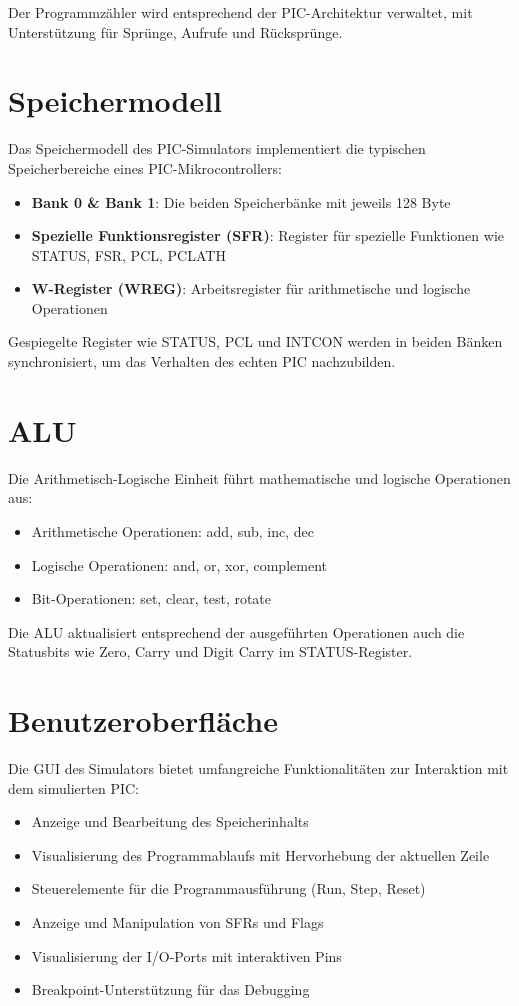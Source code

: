 \documentclass[a4paper,11pt]{report}
\begin{document}
Der Programmzähler wird entsprechend der PIC-Architektur verwaltet, mit Unterstützung für Sprünge, Aufrufe und Rücksprünge.

\section{Speichermodell}
Das Speichermodell des PIC-Simulators implementiert die typischen Speicherbereiche eines PIC-Mikrocontrollers:

\begin{itemize}
    \item \textbf{Bank 0 \& Bank 1}: Die beiden Speicherbänke mit jeweils 128 Byte
    \item \textbf{Spezielle Funktionsregister (SFR)}: Register für spezielle Funktionen wie STATUS, FSR, PCL, PCLATH
    \item \textbf{W-Register (WREG)}: Arbeitsregister für arithmetische und logische Operationen
\end{itemize}

Gespiegelte Register wie STATUS, PCL und INTCON werden in beiden Bänken synchronisiert, um das Verhalten des echten PIC nachzubilden.

\section{ALU}
Die Arithmetisch-Logische Einheit führt mathematische und logische Operationen aus:

\begin{itemize}
    \item Arithmetische Operationen: add, sub, inc, dec
    \item Logische Operationen: and, or, xor, complement
    \item Bit-Operationen: set, clear, test, rotate
\end{itemize}

Die ALU aktualisiert entsprechend der ausgeführten Operationen auch die Statusbits wie Zero, Carry und Digit Carry im STATUS-Register.

\section{Benutzeroberfläche}
Die GUI des Simulators bietet umfangreiche Funktionalitäten zur Interaktion mit dem simulierten PIC:

\begin{itemize}
    \item Anzeige und Bearbeitung des Speicherinhalts
    \item Visualisierung des Programmablaufs mit Hervorhebung der aktuellen Zeile
    \item Steuerelemente für die Programmausführung (Run, Step, Reset)
    \item Anzeige und Manipulation von SFRs und Flags
    \item Visualisierung der I/O-Ports mit interaktiven Pins
    \item Breakpoint-Unterstützung für das Debugging
\end{itemize}
\end{document}
